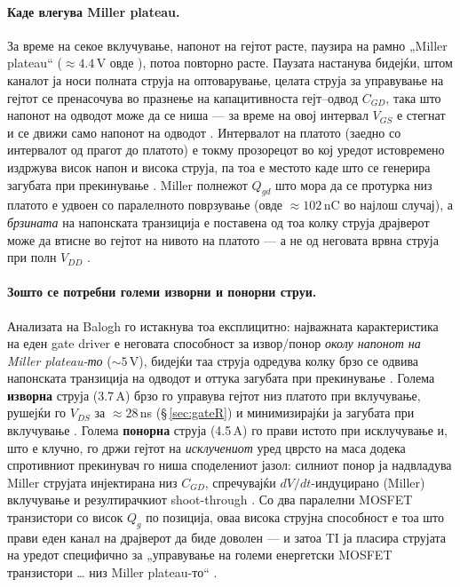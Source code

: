 \documentclass[11pt,a4paper]{article}
\newcommand{\eng}[1]{\textenglish{#1}}
\begin{document}
\paragraph{Каде влегува Miller plateau.} За време на секое вклучување, напонот на гејтот расте, паузира на рамно „\eng{Miller plateau}“ ($\approx 4.4$\,V овде \cite{ref1}), потоа повторно расте. Паузата настанува бидејќи, штом каналот ја носи полната струја на оптоварување, целата струја за управување на гејтот се пренасочува во празнење на капацитивноста гејт--одвод $C_{GD}$, така што напонот на одводот може да се ниша --- за време на овој интервал $V_{GS}$ е стегнат и се движи само напонот на одводот \cite{ref5}. Интервалот на платото (заедно со интервалот од прагот до платото) е токму прозорецот во кој уредот истовремено издржува висок напон и висока струја, па тоа е местото каде што се генерира загубата при прекинување \cite{ref5}. \eng{Miller} полнежот $Q_{gd}$ што мора да се протурка низ платото е удвоен со паралелното поврзување (овде $\approx 102$\,nC во најлош случај), а \emph{брзината} на напонската транзиција е поставена од тоа колку струја драјверот може да втисне во гејтот на нивото на платото --- а не од неговата врвна струја при полн $V_{DD}$ \cite{ref5}.

\paragraph{Зошто се потребни големи изворни и понорни струи.} Анализата на Balogh го истакнува тоа експлицитно: најважната карактеристика на еден \eng{gate driver} е неговата способност за извор/понор \emph{околу напонот на \eng{Miller plateau}-то} ($\sim 5$\,V), бидејќи таа струја одредува колку брзо се одвива напонската транзиција на одводот и оттука загубата при прекинување \cite{ref5}. Голема \textbf{изворна} струја (3.7\,A) брзо го управува гејтот низ платото при вклучување, рушејќи го $V_{DS}$ за $\approx 28$\,ns (\S\,\ref{sec:gateR}) и минимизирајќи ја загубата при вклучување \cite{ref3,ref5}. Голема \textbf{понорна} струја (4.5\,A) го прави истото при исклучување и, што е клучно, го држи гејтот на \emph{исклучениот} уред цврсто на маса додека спротивниот прекинувач го ниша споделениот јазол: силниот понор ја надвладува \eng{Miller} струјата инјектирана низ $C_{GD}$, спречувајќи $dV/dt$-индуцирано (\eng{Miller}) вклучување и резултирачкиот \eng{shoot-through} \cite{ref3,ref5}. Со два паралелни MOSFET транзистори со висок $Q_g$ по позиција, оваа висока струјна способност е тоа што прави еден канал на драјверот да биде доволен --- и затоа TI ја пласира струјата на уредот специфично за „управување на големи енергетски MOSFET транзистори \ldots{} низ \eng{Miller plateau}-то“ \cite{ref3}.
\end{document}
